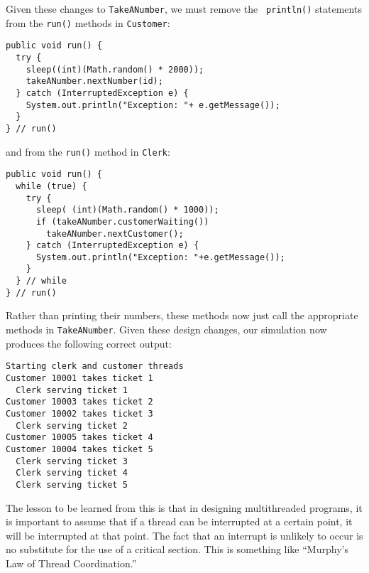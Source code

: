 \pagebreak
Given these changes to {\tt TakeANumber}, we must remove the {\tt
println()} statements from the {\tt run()} methods in {\tt Customer}:

\begin{jjjlisting}
\begin{lstlisting}
public void run() {
  try {
    sleep((int)(Math.random() * 2000));
    takeANumber.nextNumber(id);
  } catch (InterruptedException e) {
    System.out.println("Exception: "+ e.getMessage());
  }
} // run()
\end{lstlisting}
\end{jjjlisting}

\noindent and from the {\tt run()} method in {\tt Clerk}:

\begin{jjjlisting}
\begin{lstlisting}
public void run() {
  while (true) {
    try {
      sleep( (int)(Math.random() * 1000));
      if (takeANumber.customerWaiting())
        takeANumber.nextCustomer();    
    } catch (InterruptedException e) {
      System.out.println("Exception: "+e.getMessage());
    }
  } // while
} // run()
\end{lstlisting}
\end{jjjlisting}

\noindent Rather than printing their numbers, these
methods now just call the appropriate methods in {\tt TakeANumber}.
Given these design changes, our simulation now produces the
following correct output:


\begin{jjjlisting}
\begin{lstlisting}
Starting clerk and customer threads
Customer 10001 takes ticket 1
  Clerk serving ticket 1
Customer 10003 takes ticket 2
Customer 10002 takes ticket 3
  Clerk serving ticket 2
Customer 10005 takes ticket 4
Customer 10004 takes ticket 5
  Clerk serving ticket 3
  Clerk serving ticket 4
  Clerk serving ticket 5
\end{lstlisting}
\end{jjjlisting}

\noindent The lesson to be learned from this is that in
designing multithreaded programs, it is important to assume that if a
thread can be interrupted at a certain point, it will be interrupted at
that point.  The fact that an interrupt is unlikely to occur is no
substitute for the use of a critical section.  This is something like
``Murphy's Law of Thread Coordination.''


